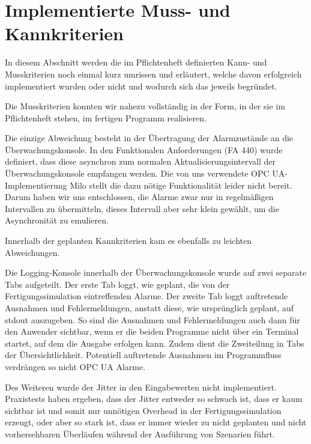 \documentclass[parskip=full]{scrartcl}
\begin{document}
\section{Implementierte Muss- und Kannkriterien}
In diesem Abschnitt werden die im Pflichtenheft definierten Kann- und Musskriterien noch einmal kurz umrissen und erläutert, welche davon erfolgreich
implementiert wurden oder nicht und wodurch sich das jeweils begründet.

Die Musskriterien konnten wir nahezu vollständig in der Form, in der sie im Pflichtenheft stehen, im fertigen Programm realisieren.

Die einzige Abweichung besteht in der Übertragung der Alarmzustände an die Überwachungskonsole. In den Funktionalen Anforderungen (FA 440) wurde definiert,
dass diese asynchron zum normalen Aktualisierungsintervall der Überwachungskonsole empfangen werden. Die von uns verwendete OPC UA-Implementierung Milo
stellt die dazu nötige Funktionalität leider nicht bereit. Darum haben wir uns entschlossen, die Alarme zwar nur in regelmäßigen Intervallen zu übermitteln,
dieses Intervall aber sehr klein gewählt, um die Asynchronität zu emulieren.

Innerhalb der geplanten Kannkriterien kam es ebenfalls zu leichten Abweichungen.

Die Logging-Konsole innerhalb der Überwachungskonsole wurde auf zwei separate Tabs aufgeteilt. Der erste Tab loggt, wie geplant, die von der Fertigungssimulation
eintreffenden Alarme. Der zweite Tab loggt auftretende Ausnahmen und Fehlermeldungen, anstatt diese, wie ursprünglich geplant, auf stdout auszugeben. So sind die
Ausnahmen und Fehlermeldungen auch dann für den Anwender sichtbar, wenn er die beiden Programme nicht über ein Terminal startet, auf dem die Ausgabe erfolgen kann.
Zudem dient die Zweiteilung in Tabs der Übersichtlichkeit. Potentiell auftretende Ausnahmen im Programmfluss verdrängen so nicht OPC UA Alarme.

Des Weiteren wurde der Jitter in den Eingabewerten nicht implementiert. Praxistests haben ergeben, dass der Jitter entweder so schwach ist, dass er kaum sichtbar
ist und somit nur unnötigen Overhead in der Fertigungssimulation erzeugt, oder aber so stark ist, dass er immer wieder zu nicht geplanten und nicht vorhersehbaren
Überläufen während der Ausführung von Szenarien führt.
\end{document}
